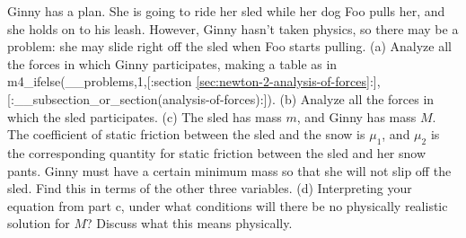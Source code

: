 Ginny has a plan. She is going to ride her sled while
her dog Foo pulls her, and she holds on to his leash.
However, Ginny hasn't taken physics,
so there may be a problem: she may slide right off the sled
when Foo starts pulling.\hwendpart
 (a) Analyze all the forces in which
Ginny participates, making a table as in 
m4_ifelse(__problems,1,[:section \ref{sec:newton-2-analysis-of-forces}:],[:__subsection_or_section(analysis-of-forces):]).\hwendpart
 (b) Analyze all the forces in which the sled participates.\hwendpart
 (c) The sled has mass $m$, and Ginny has mass $M$. The
coefficient of static friction between the sled and the snow
is $\mu_1$, and $\mu_2$ is the corresponding quantity for
static friction between the sled and her snow pants. Ginny
must have a certain minimum mass so that she will not slip
off the sled. Find this in terms of the other three
variables.\answercheck\hwendpart
(d) Interpreting your equation from part c, 
under what conditions will there be no physically realistic solution for $M$? Discuss
what this means physically.
